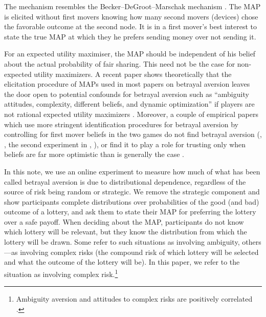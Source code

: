 The mechanism resembles the Becker--DeGroot--Marschak mechanism \citep[in short, BDM]{Becker1964}.
The MAP is elicited without first movers knowing how many second movers (devices) chose the favorable outcome at the second node.
It is in a first mover's best interest to state the true MAP at which they he prefers sending money over not sending it.

For an expected utility maximiser, the MAP should be independent of his belief about the actual probability of fair sharing.
This need not be the case for non-expected utility maximizers.
A recent paper shows theoretically that the elicitation procedure of MAPs used in most papers on betrayal aversion leaves the door open to potential confounds for betrayal aversion such as ``ambiguity attitudes, complexity, different beliefs, and dynamic optimization'' if players are not rational expected utility maximizers \citep{Li2020a}.
Moreover, a couple of empirical papers which use more stringent identification procedures for betrayal aversion by controlling for first mover beliefs in the two games do not find betrayal aversion (\citeauthor{Fetchenhauer2012}, \citeyear{Fetchenhauer2012}, the second experiment in \citeauthor{Polipciuc2022inout}, \citeyear{Polipciuc2022inout}), or find it to play a role for trusting only when beliefs are far more optimistic than is generally the case \citep{Engelmann2021}.

In this note, we use an online experiment to measure how much of what has been called betrayal aversion is due to distributional dependence, regardless of the source of risk being random or strategic.
We remove the strategic component and show participants complete distributions over probabilities of the good (and bad) outcome of a lottery, and ask them to state their MAP for preferring the lottery over a safe payoff.
When deciding about the MAP, participants do not know which lottery will be relevant, but they know the distribution from which the lottery will be drawn.
Some refer to such situations as involving ambiguity, others---as involving complex risks (the compound risk of which lottery will be selected and what the outcome of the lottery will be).
In this paper, we refer to the situation as involving complex risk.\footnote{
Ambiguity aversion and attitudes to complex risks are positively correlated \citep{Armantier2016}.
}

